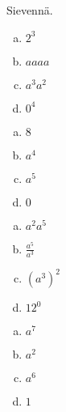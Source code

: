    	Sievennä.
    \begin{tehtava}%
		\begin{enumerate}[a)]
        	\item $2^3 $ 
        	\item $aaaa$ 
        	\item $a^3a^2$ 
        	\item $0^4$
		\end{enumerate}        
        \begin{vastaus}
        \begin{enumerate}[a)]
            \item $8$ 
            \item $a^4$ 
            \item $a^5$ 
            \item $0$
        \end{enumerate}
        \end{vastaus}
    \end{tehtava}

    \begin{tehtava}%
        \begin{enumerate}[a)]
        	\item $a^2a^5 $ 
        	\item $\frac{a^5}{a^3}$ 
        	\item $(a^3)^2$ 
        	\item $12^0$
		\end{enumerate}        
        \begin{vastaus}
        \begin{enumerate}[a)]
            \item $a^7$ 
            \item $a^2$ 
            \item $a^6$ 
            \item $1$
        \end{enumerate}
        \end{vastaus}
    \end{tehtava}    
    
        
